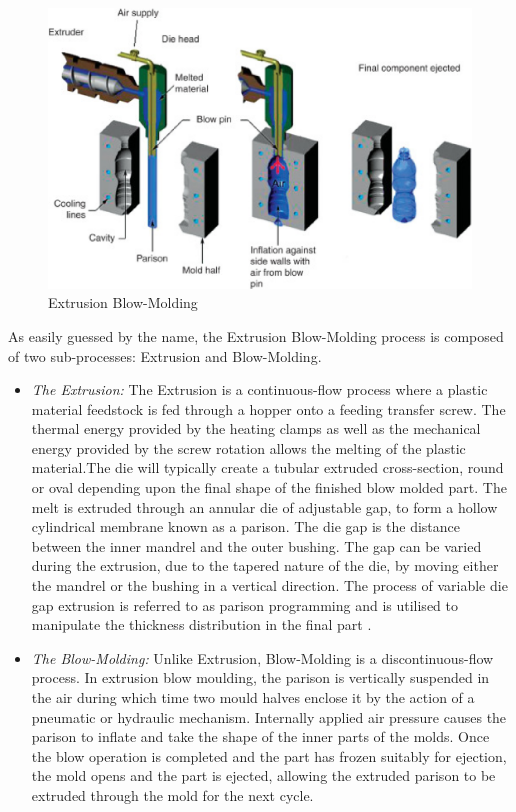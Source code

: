 \begin{figure}
\centerline{\includegraphics[scale=0.75]{images/chapter_1/extrusion_blow_molding.eps}}
\caption{Extrusion Blow-Molding \citep{goodship2015design}}
\label{fig:Extrusion Blow-Molding}
\end{figure}

As easily guessed by the name, the Extrusion Blow-Molding process is composed of two sub-processes: Extrusion and Blow-Molding.

\begin{itemize}
    \item \textit{The Extrusion:} The Extrusion is a continuous-flow process where a plastic material feedstock is fed through a hopper onto a feeding transfer screw. The thermal energy provided by the heating clamps as well as the mechanical energy provided by the screw rotation allows the melting of the plastic material.The die will typically create a tubular extruded cross-section, round or oval depending upon the final shape of the finished blow molded part. The melt is extruded through an annular die of adjustable gap, to form a hollow cylindrical membrane known as a parison. The die gap is the distance between the inner mandrel and the outer bushing. The gap can be varied during the extrusion, due to the tapered nature of the die, by moving either the mandrel or the bushing in a vertical direction. The process of variable die gap extrusion is referred to as parison programming and is utilised to manipulate the thickness distribution in the final part \citep{diraddo1993profile}.
    \item \textit{The Blow-Molding:} Unlike Extrusion, Blow-Molding is a discontinuous-flow process. In extrusion blow moulding, the parison is vertically suspended in the air during which time two mould halves enclose it by the action of a pneumatic or hydraulic mechanism. Internally applied air pressure causes the parison to inflate and take the shape of the inner parts of the molds. Once the blow operation is completed and the part has frozen suitably for ejection, the mold opens and the part is ejected, allowing the extruded parison to be extruded through the mold for the next cycle. 
\end{itemize}

